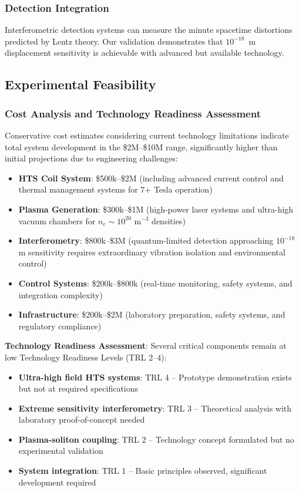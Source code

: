\documentclass[12pt,a4paper]{article}
\begin{document}
\subsubsection{Detection Integration}
Interferometric detection systems can measure the minute spacetime distortions predicted by Lentz theory. Our validation demonstrates that $10^{-18}$~m displacement sensitivity is achievable with advanced but available technology.

\subsection{Experimental Feasibility}

\subsubsection{Cost Analysis and Technology Readiness Assessment}
Conservative cost estimates considering current technology limitations indicate total system development in the \$2M--\$10M range, significantly higher than initial projections due to engineering challenges:
\begin{itemize}
\item \textbf{HTS Coil System}: \$500k--\$2M (including advanced current control and thermal management systems for 7+ Tesla operation)
\item \textbf{Plasma Generation}: \$300k--\$1M (high-power laser systems and ultra-high vacuum chambers for $n_e \sim 10^{20}$ m$^{-3}$ densities)
\item \textbf{Interferometry}: \$800k--\$3M (quantum-limited detection approaching $10^{-18}$ m sensitivity requires extraordinary vibration isolation and environmental control)
\item \textbf{Control Systems}: \$200k--\$800k (real-time monitoring, safety systems, and integration complexity)
\item \textbf{Infrastructure}: \$200k--\$2M (laboratory preparation, safety systems, and regulatory compliance)
\end{itemize}

\textbf{Technology Readiness Assessment}: Several critical components remain at low Technology Readiness Levels (TRL 2--4):
\begin{itemize}
\item \textbf{Ultra-high field HTS systems}: TRL 4 -- Prototype demonstration exists but not at required specifications
\item \textbf{Extreme sensitivity interferometry}: TRL 3 -- Theoretical analysis with laboratory proof-of-concept needed
\item \textbf{Plasma-soliton coupling}: TRL 2 -- Technology concept formulated but no experimental validation
\item \textbf{System integration}: TRL 1 -- Basic principles observed, significant development required
\end{itemize}
\end{document}
